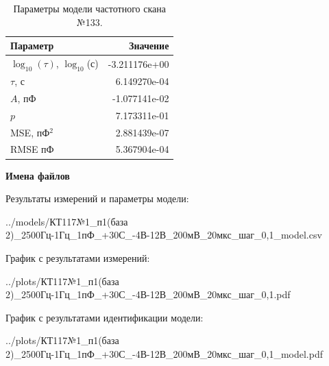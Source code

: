 \begin{table}[!ht]
    \centering
    \caption{Параметры модели частотного скана №133.}
    \begin{tabular}{|l|r|}
        \hline
        Параметр                                       & Значение                  \\ \hline
        $\log_{10}(\tau)$, $\log_{10}$(с)              & -3.211176e+00             \\ \hline
        $\tau$, с                                      & 6.149270e-04              \\ \hline
        $A$, пФ                                        & -1.077141e-02             \\ \hline
        $p$                                            & 7.173311e-01              \\ \hline
        MSE, пФ$^2$                                    & 2.881439e-07              \\ \hline
        RMSE пФ                                        & 5.367904e-04              \\ \hline
    \end{tabular}
    \label{table:frequency_scan_model_133}
\end{table}

\textbf{Имена файлов}

Результаты измерений и параметры модели:

\scriptsize../models/КТ117№1\_п1(база 2)\_2500Гц-1Гц\_1пФ\_+30С\_-4В-12В\_200мВ\_20мкс\_шаг\_0,1\_model.csv
\normalsize

График с результатами измерений:

\scriptsize../plots/КТ117№1\_п1(база 2)\_2500Гц-1Гц\_1пФ\_+30С\_-4В-12В\_200мВ\_20мкс\_шаг\_0,1.pdf
\normalsize

График с результатами идентификации модели:

\scriptsize../plots/КТ117№1\_п1(база 2)\_2500Гц-1Гц\_1пФ\_+30С\_-4В-12В\_200мВ\_20мкс\_шаг\_0,1\_model.pdf
\normalsize

